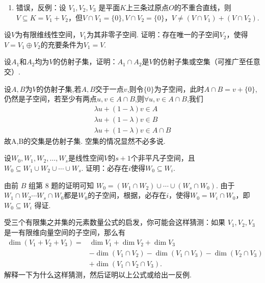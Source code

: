 \begin{exercise}
\begin{exgroup}
\begin{answer}
\begin{enumerate}
              \item 错误，反例：设 $V_1,V_2,V_3$ 是平面$K$上三条过原点$O$的不重合直线，则$V\subseteq K=V_1+V_2$，但$V\cap V_1=\{0\},V\cap V_2=\{0\}$，$V\ne (V\cap V_1)+(V\cap V_2)$.
          \end{enumerate}
        \end{answer}
        \item 设$V$为有限维线性空间，$V_1$为其非零子空间. 证明：存在唯一的子空间$V_2$，使得$V=V_1\oplus V_2$的充要条件为$V_1=V$.
        \begin{answer}

        \end{answer}

        \item 设$A_1$和$A_2$均为$V$的仿射子集，证明：$A_1\cap A_2$是$V$的仿射子集或空集（可推广至任意交）.
       \begin{answer}
        设$A,B$为$V$的仿射子集,若$A,B$交于一点$v$,则令$\{0\}$为子空间，此时$A \cap B = v+\{0\} $,仍然是子空间，若至少有两点$u,v \in A \cap B$,则$ \forall u,v \in A \cap B$,我们
        \begin{align*}
         \lambda u + (1-\lambda)v \in A \\
            \lambda u + (1-\lambda)v \in B\\
            \lambda u + (1-\lambda)v \in A \cap B
        \end{align*}
       故A,B的交集是仿射子集.
       空集的情况显然不必多说.
       \end{answer}
    \end{exgroup}

    \begin{exgroup}
        \item 设$W_0,W_1,W_2,\ldots,W_s$是线性空间$V$的$s+1$个非平凡子空间，且$W_0 \subseteq W_1 \cup W_2 \cup \cdots \cup W_s$. 证明：必存在$i$使得$W_0\subseteq W_i$.
        \begin{answer}
            由前 $B$ 组第 8 题的证明可知 $W_0=(W_1\cap W_2)\cup\cdots\cup(W_s\cap W_0)$. 由于$W_1\cap W_2\cdots W_s\cap W_0$都是$W_0$的子空间，根据，必存在$i$，使得$W_0=W_i\cap W_0$，即 $W_0\subseteq W_i$ 得证.
        \end{answer}

        \item 受三个有限集之并集的元素数量公式的启发，你可能会这样猜测：如果 $V_1,V_2,V_3$ 是一有限维向量空间的子空间，那么有
        \begin{align*}
            \dim(V_1+V_2+V_3) ={} &\dim V_1+\dim V_2+\dim V_3 \\
            &-\dim(V_1\cap V_2)-\dim(V_1\cap V_3)-\dim(V_2\cap V_3) \\
            &+\dim(V_1\cap V_2\cap V_3).
        \end{align*}
        解释一下为什么这样猜测，然后证明以上公式或给出一反例.
        \begin{answer}


\end{answer}
\end{exgroup}
\end{exercise}
